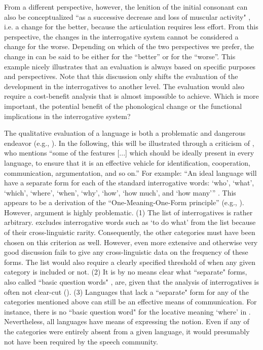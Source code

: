 \documentclass[output=paper,hidelinks]{langscibook}
\begin{document}
From a different perspective, however, the lenition of the initial consonant can also be conceptualized ``as a successive decrease and loss of muscular activity" \citep[950]{Bybee2007}, i.e. a change for the better, because the articulation requires less effort. From this perspective, the changes in the interrogative system cannot be considered a change for the worse. Depending on which of the two perspectives we prefer, the change in  can be said to be either for the ``better'' or for the ``worse''. This example nicely illustrates that an evaluation is always based on specific purposes and perspectives. Note that this discussion only shifts the evaluation of the development in the interrogatives to another level. The evaluation would also require a cost-benefit analysis that is almost impossible to achieve. Which is more important, the potential benefit of the phonological change or the functional implications in the interrogative system?

The qualitative evaluation of a language is both a problematic and dangerous endeavor (e.g., \citealt{Lehmann2006}). In the following, this will be illustrated through a criticism of \citet[213]{Dixon2016}, who mentions “some of the features [...] which should be ideally present in every language, to ensure that it is an effective vehicle for identification, cooperation, communication, argumentation, and so on.” For example: “An ideal language will have a separate form for each of the standard interrogative words: ‘who’, ‘what’, ‘which’, ‘where’, ‘when’, ‘why’, ‘how’, ‘how much’, and ‘how many’” \citep[227]{Dixon2016}. This appears to be a derivation of the ``One-Meaning-One-Form principle'' (e.g., \citealt[34]{Miestamo2008grammatical}). However,  argument is highly problematic. (1) The list of interrogatives is rather arbitrary. \citet{Dixon2016} excludes interrogative words such as `to do what' from the list because of their cross-linguistic rarity. Consequently, the other categories must have been chosen on this criterion as well. However, even  more extensive and otherwise very good discussion fails to give any cross-linguistic data on the frequency of these forms. The list would also require a clearly specified threshold of when any given category is included or not. (2) It is by no means clear what ``separate" forms, also called ``basic question words" \citep[46]{Hengeveld2012}, are, given that the analysis of interrogatives is often not clear-cut (). (3) Languages that lack a ``separate" form for any of the categories mentioned above can still be an effective means of communication. For instance, there is no ``basic question word" for the locative meaning `where' in . Nevertheless, all  languages have means of expressing the notion. Even if any of the categories were entirely absent from a given language, it would presumably not have been required by the speech community.
\end{document}

